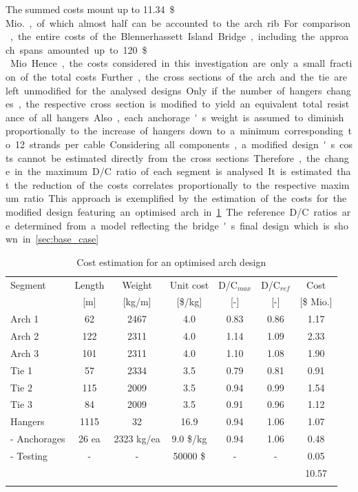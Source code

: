 The summed costs mount up to \SI{11.34}{\$\,Mio.}, of which almost half can be accounted to the arch rib. For comparison, the entire costs of the Blennerhassett Island Bridge, including the approach spans amounted up to \SI{120}{\$\,Mio}. Hence, the costs considered in this investigation are only a small fraction of the total costs. Further, the cross sections of the arch and the tie are left unmodified for the analysed designs. Only if the number of hangers changes, the respective cross section is modified to yield an equivalent total resistance of all hangers. Also, each anchorage's weight is assumed to diminish proportionally to the increase of hangers down to a minimum corresponding to 12 strands per cable. Considering all components, a modified design's costs cannot be estimated directly from the cross sections. Therefore, the change in the maximum D/C ratio of each segment is analysed. It is estimated that the reduction of the costs correlates proportionally to the respective maximum ratio. This approach is exemplified by the estimation of the costs for the modified design featuring an optimised arch in \cref{tab:met_cost_estimation}. The reference D/C ratios are determined from a model reflecting the bridge's final design which is shown in \cref{sec:base_case}

\begin{table}[H]
    \centering
    \caption{Cost estimation for an optimised arch design}
    \label{tab:met_cost_estimation}
    \begin{tabular}{lcccccc}
    \toprule
    Segment & Length & Weight & Unit cost & D/C$_{max}$ & D/C$_{ref}$ & Cost \\
     & [m] & [kg/m] & [\$/kg] & [-] & [-] & [\$ Mio.] \\ \hline
    Arch 1 & 62 & 2467 & 4.0 & 0.83 & 0.86 & 1.17 \\
    Arch 2 & 122 & 2311 & 4.0 & 1.14 & 1.09 & 2.33 \\
    Arch 3 & 101 & 2311 & 4.0 & 1.10 & 1.08 & 1.90 \\
    Tie 1 & 57 & 2334 & 3.5 & 0.79 & 0.81 & 0.91 \\
    Tie 2 & 115 & 2009 & 3.5 & 0.94 & 0.99 & 1.54 \\
    Tie 3 & 84 & 2009 & 3.5 & 0.91 & 0.96 & 1.12 \\
    Hangers & 1115 & 32 & 16.9 & 0.94 & 1.06 & 1.07 \\
    \arrayrulecolor[gray]{0.4} \midrule
    - Anchorages & 26 ea & 2323 kg/ea & 9.0 \$/kg & 0.94 & 1.06 & 0.48 \\
    - Testing & - & - & 50000 \$ & - & - & 0.05 \\ \arrayrulecolor[rgb]{0,0,0} \bottomrule
    & & & & & & 10.57 \\ \hhline{~~~~~~ =}
    \end{tabular}
    \end{table}

